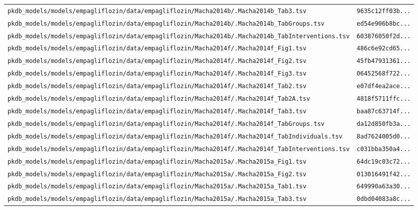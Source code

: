 \begin{longtable}{ll}
\texttt{pkdb\_models/models/empagliflozin/data/empagliflozin/Macha2014b/.Macha2014b\_Tab3.tsv} & \texttt{9635c12ff03b...} \\
\texttt{pkdb\_models/models/empagliflozin/data/empagliflozin/Macha2014b/.Macha2014b\_TabGroups.tsv} & \texttt{ed54e906b8bc...} \\
\texttt{pkdb\_models/models/empagliflozin/data/empagliflozin/Macha2014b/.Macha2014b\_TabInterventions.tsv} & \texttt{603876050f2d...} \\
\texttt{pkdb\_models/models/empagliflozin/data/empagliflozin/Macha2014f/.Macha2014f\_Fig1.tsv} & \texttt{486c6e92cd65...} \\
\texttt{pkdb\_models/models/empagliflozin/data/empagliflozin/Macha2014f/.Macha2014f\_Fig2.tsv} & \texttt{45fb47931361...} \\
\texttt{pkdb\_models/models/empagliflozin/data/empagliflozin/Macha2014f/.Macha2014f\_Fig3.tsv} & \texttt{06452568f722...} \\
\texttt{pkdb\_models/models/empagliflozin/data/empagliflozin/Macha2014f/.Macha2014f\_Tab2.tsv} & \texttt{e07df4ea2ace...} \\
\texttt{pkdb\_models/models/empagliflozin/data/empagliflozin/Macha2014f/.Macha2014f\_Tab2A.tsv} & \texttt{4818f5711ffc...} \\
\texttt{pkdb\_models/models/empagliflozin/data/empagliflozin/Macha2014f/.Macha2014f\_Tab3.tsv} & \texttt{baa87c63714f...} \\
\texttt{pkdb\_models/models/empagliflozin/data/empagliflozin/Macha2014f/.Macha2014f\_TabGroups.tsv} & \texttt{da12d850fb3a...} \\
\texttt{pkdb\_models/models/empagliflozin/data/empagliflozin/Macha2014f/.Macha2014f\_TabIndividuals.tsv} & \texttt{8ad7624005d0...} \\
\texttt{pkdb\_models/models/empagliflozin/data/empagliflozin/Macha2014f/.Macha2014f\_TabInterventions.tsv} & \texttt{c031bba350a4...} \\
\texttt{pkdb\_models/models/empagliflozin/data/empagliflozin/Macha2015a/.Macha2015a\_Fig1.tsv} & \texttt{64dc19c03c72...} \\
\texttt{pkdb\_models/models/empagliflozin/data/empagliflozin/Macha2015a/.Macha2015a\_Fig2.tsv} & \texttt{013016491f42...} \\
\texttt{pkdb\_models/models/empagliflozin/data/empagliflozin/Macha2015a/.Macha2015a\_Tab1.tsv} & \texttt{649990a63a30...} \\
\texttt{pkdb\_models/models/empagliflozin/data/empagliflozin/Macha2015a/.Macha2015a\_Tab3.tsv} & \texttt{0dbd04083a8c...} \\

\end{longtable}
